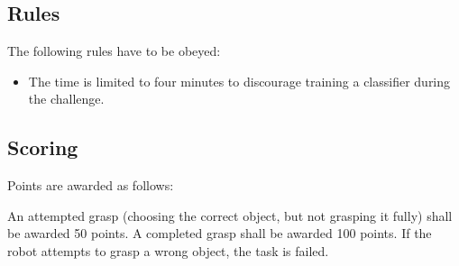 \subsection{Rules}
The following rules have to be obeyed:
\begin{itemize}
\item The time is limited to four minutes to discourage training a classifier during the challenge.
\end{itemize}


\subsection{Scoring}
Points are awarded as follows:

An attempted grasp (choosing the correct object, but not grasping it fully) shall be awarded 50 points. A completed grasp shall be awarded 100 points. If the robot attempts to grasp a wrong object, the task is failed.
